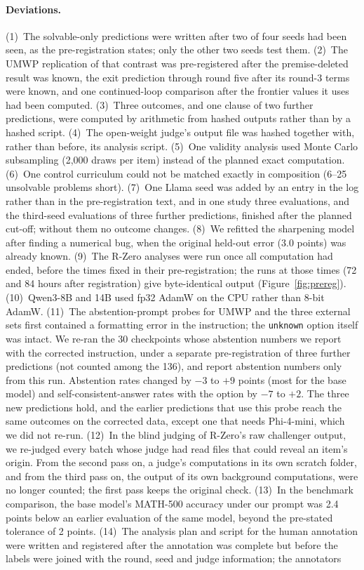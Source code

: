 \paragraph{Deviations.} (1)~The solvable-only predictions were written after two of four seeds had been seen, as the pre-registration states; only the other two seeds test them. (2)~The UMWP replication of that contrast was pre-registered after the premise-deleted result was known, the exit prediction through round five after its round-3 terms were known, and one continued-loop comparison after the frontier values it uses had been computed. (3)~Three outcomes, and one clause of two further predictions, were computed by arithmetic from hashed outputs rather than by a hashed script. (4)~The open-weight judge's output file was hashed together with, rather than before, its analysis script. (5)~One validity analysis used Monte Carlo subsampling (2,000 draws per item) instead of the planned exact computation. (6)~One control curriculum could not be matched exactly in composition (6--25 unsolvable problems short). (7)~One Llama seed was added by an entry in the log rather than in the pre-registration text, and in one study three evaluations, and the third-seed evaluations of three further predictions, finished after the planned cut-off; without them no outcome changes. (8)~We refitted the sharpening model after finding a numerical bug, when the original held-out error (3.0 points) was already known. (9)~The R-Zero analyses were run once all computation had ended, before the times fixed in their pre-registration; the runs at those times (72 and 84 hours after registration) give byte-identical output (Figure~\ref{fig:prereg}). (10)~Qwen3-8B and 14B used fp32 AdamW on the CPU rather than 8-bit AdamW. (11)~The abstention-prompt probes for UMWP and the three external sets first contained a formatting error in the instruction; the \texttt{unknown} option itself was intact. We re-ran the 30 checkpoints whose abstention numbers we report with the corrected instruction, under a separate pre-registration of three further predictions (not counted among the 136), and report abstention numbers only from this run. Abstention rates changed by $-3$ to $+9$ points (most for the base model) and self-consistent-answer rates with the option by $-7$ to $+2$. The three new predictions hold, and the earlier predictions that use this probe reach the same outcomes on the corrected data, except one that needs Phi-4-mini, which we did not re-run. (12)~In the blind judging of R-Zero's raw challenger output, we re-judged every batch whose judge had read files that could reveal an item's origin. From the second pass on, a judge's computations in its own scratch folder, and from the third pass on, the output of its own background computations, were no longer counted; the first pass keeps the original check. (13)~In the benchmark comparison, the base model's MATH-500 accuracy under our prompt was 2.4 points below an earlier evaluation of the same model, beyond the pre-stated tolerance of 2 points. (14)~The analysis plan and script for the human annotation were written and registered after the annotation was complete but before the labels were joined with the round, seed and judge information; the annotators 